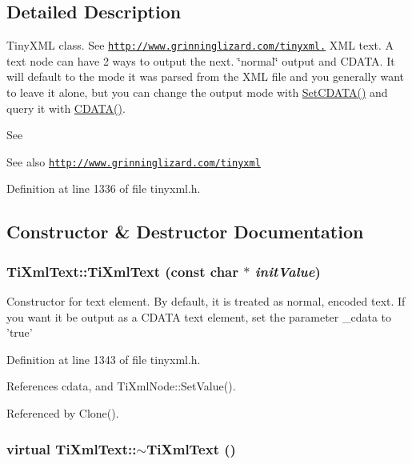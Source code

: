 \subsection{Detailed Description}
TinyXML class. See \href{http://www.grinninglizard.com/tinyxml.}{\tt http://www.grinninglizard.com/tinyxml.} XML text. A text node can have 2 ways to output the next. \char`\"{}normal\char`\"{} output and CDATA. It will default to the mode it was parsed from the XML file and you generally want to leave it alone, but you can change the output mode with \hyperlink{class_ti_xml_text_acb17ff7c5d09b2c839393445a3de5ea9}{SetCDATA()} and query it with \hyperlink{class_ti_xml_text_ad1a6a6b83fa2271022dd97c072a2b586}{CDATA()}.

See \begin{DoxySeeAlso}{See also}
\href{http://www.grinninglizard.com/tinyxml}{\tt http://www.grinninglizard.com/tinyxml} 
\end{DoxySeeAlso}


Definition at line 1336 of file tinyxml.h.

\subsection{Constructor \& Destructor Documentation}
\hypertarget{class_ti_xml_text_af659e77c6b87d684827f35a8f4895960}{
\subsubsection[{TiXmlText}]{\setlength{\rightskip}{0pt plus 5cm}TiXmlText::TiXmlText (const char $\ast$ {\em initValue})}}
\label{class_ti_xml_text_af659e77c6b87d684827f35a8f4895960}
Constructor for text element. By default, it is treated as normal, encoded text. If you want it be output as a CDATA text element, set the parameter \_\-cdata to 'true' 

Definition at line 1343 of file tinyxml.h.

References cdata, and TiXmlNode::SetValue().

Referenced by Clone().\hypertarget{class_ti_xml_text_a829a4bd2d8d2461c333eb4f3f5b1b3d2}{
\subsubsection[{$\sim$TiXmlText}]{\setlength{\rightskip}{0pt plus 5cm}virtual TiXmlText::$\sim$TiXmlText ()}}
\label{class_ti_xml_text_a829a4bd2d8d2461c333eb4f3f5b1b3d2}


